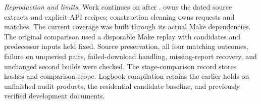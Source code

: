 \textit{Reproduction and limits.} Work continues on
 after .
 owns the dated source
extracts and explicit API recipes; construction cleaning owns requests and matches.
The current coverage was built through its actual Make dependencies. The original
comparison used a disposable Make replay with candidates and predecessor inputs
held fixed. Source preservation, all four matching outcomes, failure on unqueried
pairs, failed-download handling, missing-report recovery, and unchanged second
builds were checked. The stage-comparison record stores hashes and comparison scope.
Logbook compilation retains the earlier holds on unfinished audit products,
the residential candidate baseline, and previously verified development documents.
